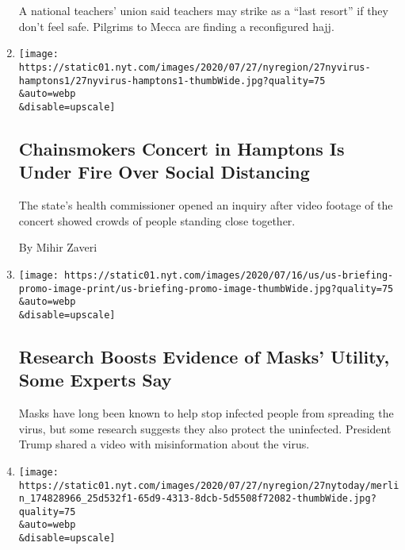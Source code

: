 \begin{enumerate}
  A national teachers' union said teachers may strike as a ``last
  resort'' if they don't feel safe. Pilgrims to Mecca are finding a
  reconfigured hajj.
\item
  \href{/2020/07/27/nyregion/hamptons-chainsmokers-concert-social-distancing.html}{}

  \texttt{[image: https://static01.nyt.com/images/2020/07/27/nyregion/27nyvirus-hamptons1/27nyvirus-hamptons1-thumbWide.jpg?quality=75\\\&auto=webp\\\&disable=upscale]}

  \hypertarget{chainsmokers-concert-in-hamptons-is-under-fire-over-social-distancing}{%
  \subsection{Chainsmokers Concert in Hamptons Is Under Fire Over Social
  Distancing}\label{chainsmokers-concert-in-hamptons-is-under-fire-over-social-distancing}}

  The state's health commissioner opened an inquiry after video footage
  of the concert showed crowds of people standing close together.

  By Mihir Zaveri
\item
  \href{/2020/07/27/world/coronavirus-covid-19.html}{}

  \texttt{[image: https://static01.nyt.com/images/2020/07/16/us/us-briefing-promo-image-print/us-briefing-promo-image-thumbWide.jpg?quality=75\\\&auto=webp\\\&disable=upscale]}

  \hypertarget{research-boosts-evidence-of-masks-utility-some-experts-say}{%
  \subsection{Research Boosts Evidence of Masks' Utility, Some Experts
  Say}\label{research-boosts-evidence-of-masks-utility-some-experts-say}}

  Masks have long been known to help stop infected people from spreading
  the virus, but some research suggests they also protect the
  uninfected. President Trump shared a video with misinformation about
  the virus.
\item
  \href{/2020/07/27/nyregion/nyc-midtown-manhattan-coronavirus.html}{}

  \texttt{[image: https://static01.nyt.com/images/2020/07/27/nyregion/27nytoday/merlin\_174828966\_25d532f1-65d9-4313-8dcb-5d5508f72082-thumbWide.jpg?quality=75\\\&auto=webp\\\&disable=upscale]}

  \hypertarget{new-york-today-1}{%
}
\end{enumerate}
